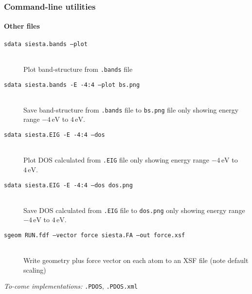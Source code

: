 \begin{frame}[fragile]
  \frametitle{Command-line utilities}
  \framesubtitle{Other files}

  \begin{description}
    \item[\texttt{sdata siesta.bands --plot}]\mbox{}\\

    Plot band-structure from \texttt{.bands} file

    \item[\texttt{sdata siesta.bands -E -4:4 --plot bs.png}]\mbox{}\\

    Save band-structure from \texttt{.bands} file to \texttt{bs.png} file only showing
    energy range $-4\,\mathrm{eV}$ to $4\,\mathrm{eV}$.

    \item[\texttt{sdata siesta.EIG -E -4:4 --dos}]\mbox{}\\

    Plot DOS calculated from \texttt{.EIG} file only showing
    energy range $-4\,\mathrm{eV}$ to $4\,\mathrm{eV}$.

    \item[\texttt{sdata siesta.EIG -E -4:4 --dos dos.png}]\mbox{}\\

    Save DOS calculated from \texttt{.EIG} file to \texttt{dos.png} only showing
    energy range $-4\,\mathrm{eV}$ to $4\,\mathrm{eV}$.

    \item[\texttt{sgeom RUN.fdf --vector force siesta.FA --out force.xsf}]\mbox{}\\

    Write geometry plus force vector on each atom to an XSF file (note default scaling)

  \end{description}

  \emph{To-come implementations:} \texttt{.PDOS}, \texttt{.PDOS.xml}
  
\end{frame}
